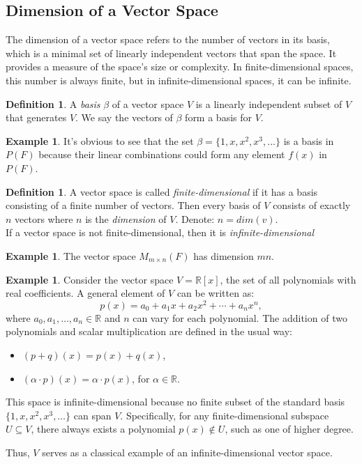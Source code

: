 \documentclass[12pt, reqno]{amsart}
\theoremstyle{definition}
\newtheorem{definition}[theorem]{Definition}
\newtheorem{example}[theorem]{Example}
\numberwithin{equation}{section}
\newcommand{\dR}{{\mathbb R}}
\newcommand{\tabb}{\hspace*{1cm}}
\begin{document}
\vfill
\subsection{Dimension of a Vector Space}
The dimension of a vector space refers to the number of vectors in its basis, which is a minimal set of linearly independent vectors that span the space. It provides a measure of the space's size or complexity. In finite-dimensional spaces, this number is always finite, but in infinite-dimensional spaces, it can be infinite.

    \begin{definition}
    A \textit{basis} $\beta$ of a vector space $V$ is a linearly independent subset of $V$ that generates $V$. We say the vectors of $\beta$ form a basis for $V$.
    \end{definition}

    \begin{example}
        It's obvious to see that the set $\beta =\{1, x, x^2, x^3,...\}$ is a basis in $P(F)$ because their linear combinations could form any element $f(x)$ in $P(F)$.
    \end{example}

    \begin{definition}
        A vector space is called \textit{finite-dimensional} if it has a basis consisting of a finite number of vectors. Then every basis of $V$ consists of exactly $n$ vectors where $n$ is the \textit{dimension} of $V$. Denote: $n = dim(v)$.\\
        \tabb If a vector space is not finite-dimensional, then it is \textit{infinite-dimensional}
    \end{definition}

    \begin{example}
        The vector space $M_{m\times n}(F)$ has dimension $mn$.
    \end{example}

    \begin{example}
    Consider the vector space \( V = \dR[x] \), the set of all polynomials with real coefficients. A general element of \( V \) can be written as:
    $$
    p(x) = a_0 + a_1 x + a_2 x^2 + \cdots + a_n x^n,
    $$
    where \( a_0, a_1, \dots, a_n \in \dR \) and \( n \) can vary for each polynomial. The addition of two polynomials and scalar multiplication are defined in the usual way:
    \begin{itemize}
        \item \( (p + q)(x) = p(x) + q(x) \),
        \item \( (\alpha \cdot p)(x) = \alpha \cdot p(x) \), for \( \alpha \in \dR \).
    \end{itemize}

    This space is infinite-dimensional because no finite subset of the standard basis \( \{1, x, x^2, x^3, \dots\} \) can span \( V \). Specifically, for any finite-dimensional subspace \( U \subseteq V \), there always exists a polynomial \( p(x) \notin U \), such as one of higher degree.

    Thus, \( V \) serves as a classical example of an infinite-dimensional vector space.
    \end{example}
\end{document}
